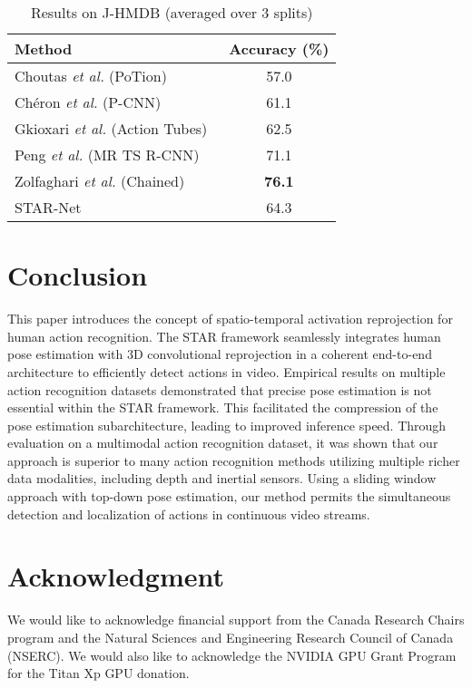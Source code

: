 \documentclass[10pt, conference, compsocconf]{IEEEtran}
\begin{document}
\begin{table}
\caption{Results on J-HMDB (averaged over 3 splits)}
\vspace{-10pt}
\begin{center}
\begin{tabular}{|l|c|}
\hline
Method & Accuracy (\%) \\
\hline\hline
Choutas \textit{et al.} (PoTion)~\cite{choutas2018potion} & 57.0\\
Chéron \textit{et al.} (P-CNN)~\cite{cheronICCV15} & 61.1\\
Gkioxari \textit{et al.} (Action Tubes)~\cite{gkioxari2015finding} & 62.5\\
Peng \textit{et al.} (MR TS R-CNN)~\cite{peng2016multi} & 71.1\\
Zolfaghari \textit{et al.} (Chained)~\cite{zolfaghari2017chained} & \textbf{76.1}\\
\hline
STAR-Net & 64.3\\
\hline 
\end{tabular}
\end{center}
\label{tab:jhmdb_soa}
\vspace{-20pt}
\end{table}

\section{Conclusion}
This paper introduces the concept of spatio-temporal activation reprojection for human action recognition. The STAR framework seamlessly integrates human pose estimation with 3D convolutional reprojection in a coherent end-to-end architecture to efficiently detect actions in video. Empirical results on multiple action recognition datasets demonstrated that precise pose estimation is not essential within the STAR framework. This facilitated the compression of the pose estimation subarchitecture, leading to improved inference speed. Through evaluation on a multimodal action recognition dataset, it was shown that our approach is superior to many action recognition methods utilizing multiple richer data modalities, including depth and inertial sensors. Using a sliding window approach with top-down pose estimation, our method permits the simultaneous detection and localization of actions in continuous video streams.



\section*{Acknowledgment}
We would like to acknowledge financial support from the Canada Research Chairs program and the Natural Sciences and Engineering Research Council of Canada (NSERC). We would also like to acknowledge the NVIDIA GPU Grant Program for the Titan Xp GPU donation. 










\end{document}
